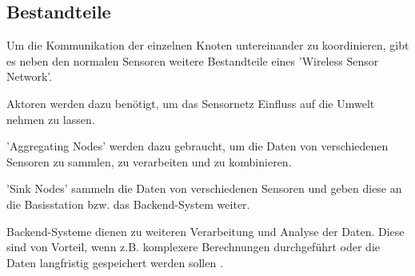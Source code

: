 \subsection{Bestandteile}\label{ss:Bestandteile}

Um die Kommunikation der einzelnen Knoten untereinander zu koordinieren, gibt es neben den normalen Sensoren weitere Bestandteile eines 'Wireless Sensor Network'.

Aktoren werden dazu benötigt, um das Sensornetz Einfluss auf die Umwelt nehmen zu lassen.

'Aggregating Nodes' werden dazu gebraucht, um die Daten von verschiedenen Sensoren zu sammlen, zu verarbeiten und zu kombinieren.

'Sink Nodes' sammeln die Daten von verschiedenen Sensoren und geben diese an die Basisstation bzw. das Backend-System weiter.

Backend-Systeme dienen zu weiteren Verarbeitung und Analyse der Daten.
Diese sind von Vorteil, wenn z.B. komplexere Berechnungen durchgeführt oder die Daten langfristig gespeichert werden sollen \cite{d:wolf}.